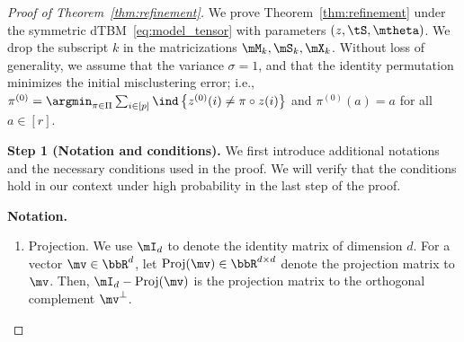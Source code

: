 \documentclass[lettersize,onecolumn,journal]{IEEEtran}
\theoremstyle{definition}
\theoremstyle{definition}
\newcommand{\offf}[1]{\left\{#1\right\}}
\begin{document}
\begin{proof}[Proof of Theorem~\ref{thm:refinement}]
We prove Theorem~\ref{thm:refinement} under the symmetric dTBM~\eqref{eq:model_tensor} with parameters $(z, \tS, \mtheta)$. We drop the subscript $k$ in the matricizations $\mM_k, \mS_k, \mX_k$. Without loss of generality, we assume that the variance $\sigma = 1$, and that the identity permutation minimizes the initial misclustering error; i.e., $\pi^{(0)} = \argmin_{\pi \in \Pi} \sum_{i \in [p]}\ind \offf{z^{(0)}(i) \neq \pi \circ z(i) }$ and $\pi^{(0)}(a) = a$ for all $ a \in [r]$.


{\bf Step 1 (Notation and conditions).} We first introduce additional notations and the necessary conditions used in the proof. We will verify that the conditions hold in our context under high probability in the last step of the proof. 

\textbf{Notation.}
\begin{enumerate}[wide]

\item Projection. We use $\mI_d$ to denote the identity matrix of dimension $d$. For a vector $\mv \in \bbR^d$, let $\text{Proj}(\mv) \in \bbR^{d \times d}$ denote the projection matrix to $\mv$. Then, $\mI_d - \text{Proj}(\mv)$ is the projection matrix to the orthogonal complement $\mv^{\perp}$. 


\end{enumerate}
\end{proof}
\end{document}
